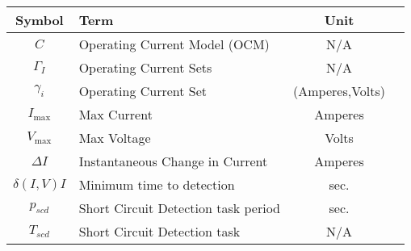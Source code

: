\begin{center}
    \bgroup
    \begin{tabular}{| c | l | c | c |}
        \hline
        Symbol & Term & Unit \\  \hline \hline \cline{1-3}
        $C$ & Operating Current Model (OCM) & N/A\\ \cline{1-3}
        $\Gamma_I$ & Operating Current Sets & N/A\\ \cline{1-3}
        $\gamma_i$ & Operating Current Set & (Amperes,Volts)\\ \cline{1-3}
        \hline
        $I_{\max}$ & Max Current & Amperes\\ \cline{1-3}
        $V_{\max}$ & Max Voltage & Volts\\ \cline{1-3}
        $\Delta I$ & Instantaneous Change in Current & Amperes\\ \cline{1-3}
        $\delta(I,V) I$ & Minimum time to detection & sec.\\ \cline{1-3}
        $p_{scd}$ & Short Circuit Detection task period & sec.\\ \cline{1-3}
        $T_{scd}$ & Short Circuit Detection task & N/A\\ \cline{1-3}
        \hline
    \end{tabular}
    \egroup
\end{center}